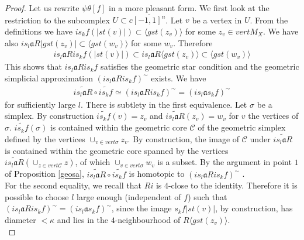 \documentclass[a4paper,11pt]{article}
\theoremstyle{definition}
\theoremstyle{plain}
\theoremstyle{remark}
\begin{document}
{\begin{proof}
Let us rewrite $\psi \theta[f]$ in a more pleasant form. We first look at the restriction to the subcomplex $U\subset c\overline{[-1,1]^n}$. Let $v$ be a vertex in $U$. From the definitions we have $i s_{k} f(|st(v)|) \subset \langle gst(z_v) \rangle$ for some $z_v\in vert M_{X}$. We have also $is_{l}\mathfrak{a}R |gst(z_v)| \subset \langle gst(w_v) \rangle$ for some $w_v$. Therefore 
\begin{align*}
is_{l}\mathfrak{a}Ri s_{k} f(|st(v)|) \subset is_{l}\mathfrak{a}R \langle gst(z_v)\rangle \subset  \langle gst(w_v) \rangle
\end{align*}
This shows that $is_{l}\mathfrak{a}Ri s_{k} f$ satisfies the geometric star condition and the geometric simplicial approximation $(is_{l}\mathfrak{a}Ri s_{k} f)^{\sim}$ exists. We have 
\begin{align*}
\widetilde{i s_{l}\mathfrak{a}R}\circ \widetilde{i s_{k} f} \simeq (is_{l}\mathfrak{a}R i s_{k} f)^{\sim} = (i s_{l} \mathfrak{a} s_{k} f)^{\sim}
\end{align*}
for sufficiently large $l$. There is subtlety in the first equivalence. Let $\sigma$ be a simplex. By construction $\widetilde{is_{k}f}(v) = z_{v}$ and $\widetilde{is_{l}\mathfrak{a}R}(z_{v}) = w_{v}$ for $v$ the vertices of $\sigma$. $\widetilde{is_{k}f}(\sigma)$ is contained within the geometric core $\mathscr{C}$ of the geometric simplex defined by the vertices $\cup_{v\in vert \sigma} z_{v}$. By construction, the image of $\mathscr{C}$ under $\widetilde{is_{l}\mathfrak{a}R}$ is contained within the geometric core spanned by the vertices $\widetilde{is_{l}\mathfrak{a}R}(\cup_{z\in vert \mathscr{C}} z)$, of which $\cup_{v\in vert \sigma} w_{v}$ is a subset. By the argument in point $1$ of Proposition \ref{geosa}, $\widetilde{i s_{l}\mathfrak{a}R}\circ \widetilde{i s_{k} f}$ is homotopic to $(is_{l}\mathfrak{a}R i s_{k} f)^{\sim}$ .\\

For the second equality, we recall that $Ri$ is $4$-close to the identity. Therefore it is possible to choose $l$ large enough (independent of $f$) such that  $(is_{l}\mathfrak{a}R i s_{k} f)^{\sim}=(i s_{l} \mathfrak{a} s_{k} f)^{\sim}$, since the image $s_{k}f  |st(v)|$, by construction, has diameter $<\kappa$ and lies in the $4$-neighbourhood of $R\langle gst(z_v) \rangle$. \\



\end{proof}}
\end{document}
